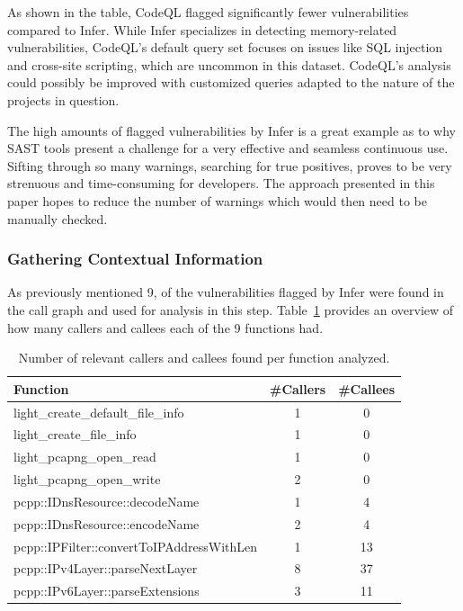 As shown in the table, CodeQL flagged significantly fewer vulnerabilities compared to Infer. While Infer specializes in detecting memory-related vulnerabilities, CodeQL's default query set focuses on issues like SQL injection and cross-site scripting, which are uncommon in this dataset. CodeQL's analysis could possibly be improved with customized queries adapted to the nature of the projects in question.

The high amounts of flagged vulnerabilities by Infer is a great example as to why SAST tools present a challenge for a very effective and seamless continuous use. Sifting through so many warnings, searching for true positives, proves to be very strenuous and time-consuming for developers. The approach presented in this paper hopes to reduce the number of warnings which would then need to be manually checked.

\subsubsection{Gathering Contextual Information}
As previously mentioned 9, of the vulnerabilities flagged by Infer were found in the call graph and used for analysis in this step. Table~\ref{context} provides an overview of how many callers and callees each of the 9 functions had.

\begin{table}[ht]
\centering
\caption{Number of relevant callers and callees found per function analyzed.}
\label{context}
\begin{tabular}{|l|c|c|}
\hline
\textbf{Function} & \textbf{\#Callers} & \textbf{\#Callees} \\
\hline
light\_create\_default\_file\_info & 1 & 0 \\
light\_create\_file\_info & 1 & 0 \\
light\_pcapng\_open\_read & 1 & 0 \\
light\_pcapng\_open\_write & 2 & 0 \\
pcpp::IDnsResource::decodeName & 1 & 4 \\
pcpp::IDnsResource::encodeName & 2 & 4 \\
pcpp::IPFilter::convertToIPAddressWithLen & 1 & 13 \\
pcpp::IPv4Layer::parseNextLayer & 8 & 37 \\
pcpp::IPv6Layer::parseExtensions & 3 & 11 \\
\hline
\end{tabular}
\end{table}


